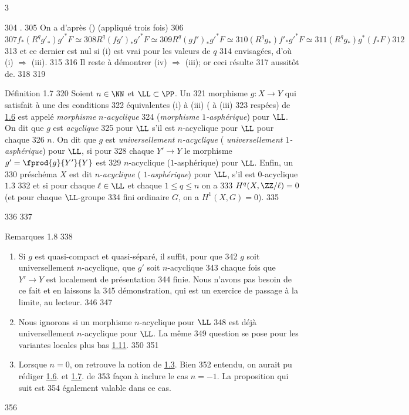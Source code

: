 3	\documentclass[10pt]{../fichiers-configuration-latex/smfart}
\begin{document}
   304	.
   305	On a d'après  (\resp {}) (appliqué trois fois)
   306	$$
   307	f_{\ast}(R^{q}{g'}_{\ast}){g'}^{\ast}F\simeq
   308	R^{q}(fg')_{\ast}{g'}^{\ast}F\simeq
   309	R^{q}(gf')_{\ast}{g'}^{\ast}F\simeq
   310	(R^{q}g_{\ast}){f'}_{\ast}{g'}^{\ast}F\simeq
   311	(R^{q}g_{\ast})g^{\ast}(f_{\ast}F)
   312	$$
   313	et ce dernier est nul si (i) est vrai pour les valeurs de $q$
   314	envisagées, d'où (i) $\Rightarrow$ (iii).
   315	
   316	Il reste à démontrer (iv) $\Rightarrow$ (iii); or ceci résulte
   317	aussitôt de\pageoriginale {}.
   318	
   319	\begin{enonce*}{Définition 1.7}
   320	Soient $n\in \NN$ et $\LL\subset \PP$. Un
   321	morphisme $g:X\rightarrow Y$ qui satisfait à une des conditions
   322	équivalentes {\rm(i)} à {\rm(iii)} ( à {\rm(iii)}
   323	respées) de \hyperref[XV.prop1.6]{1.6} est appelé \emph{morphisme $n$-acyclique}
   324	(\resp \emph{morphisme $1$-asphérique}) pour $\LL$. On dit que $g$ est \emph{acyclique}
   325	pour $\LL$ s'il est $n$-acyclique pour $\LL$ pour chaque
   326	$n$. On dit que $g$ est \emph{universellement $n$-acyclique} (	\emph{universellement $1$-asphérique}) pour $\LL$, si pour
   328	chaque $Y'\rightarrow Y$ le morphisme $g'=\fprod{g}{Y'}{Y}$ est
   329	$n$-acyclique (\resp $1$-asphérique) pour $\LL$. Enfin, un
   330	préschéma $X$ est dit $n$-\emph{acyclique} (	$1$-\emph{asphérique}) pour $\LL$, s'il est $0$-acyclique $1.3$
   332	et si pour chaque $\ell \in \LL$ et chaque $1\leq q\leq n$ on a
   333	$H^{q}(X,\ZZ/\ell)=0$ (\resp et pour chaque $\LL$-groupe
   334	fini ordinaire $G$, on a $H^{1}(X,G)=0$).
   335	\end{enonce*}
   336	
   337	\begin{enonce*}[remark]{Remarques 1.8}
   338	\begin{enumerate}
   339	\renewcommand{\theenumi}{\alph{enumi}}
   340	\renewcommand{\labelenumi}{\theenumi)}
   341	\item Si $g$ est quasi-compact et quasi-séparé, il suffit, pour que
   342	$g$ soit universellement $n$-acyclique, que $g'$ soit $n$-acyclique
   343	chaque fois que $Y'\rightarrow Y$ est localement de présentation
   344	finie. Nous n'avons pas besoin de ce fait et en laissons la
   345	démonstration, qui est un exercice de passage à la limite, au lecteur.
   346	
   347	\item Nous ignorons si un morphisme $n$-acyclique pour $\LL$
   348	est déjà universellement $n$-acyclique pour $\LL$. La même
   349	question se pose pour les variantes locales plus bas \hyperref[XV.def1.11]{1.11}.
   350	
   351	\item Lorsque $n=0$, on retrouve la notion de \hyperref[XV.def1.3]{1.3}. Bien
   352	entendu, on aurait pu rédiger \hyperref[XV.prop1.6]{1.6}. et \hyperref[XV.def1.7]{1.7}. de
   353	façon à inclure le cas $n=-1$. La proposition qui suit est
   354	également valable dans ce cas.	\end{enumerate}
   356	\end{enonce*}
\end{document}
